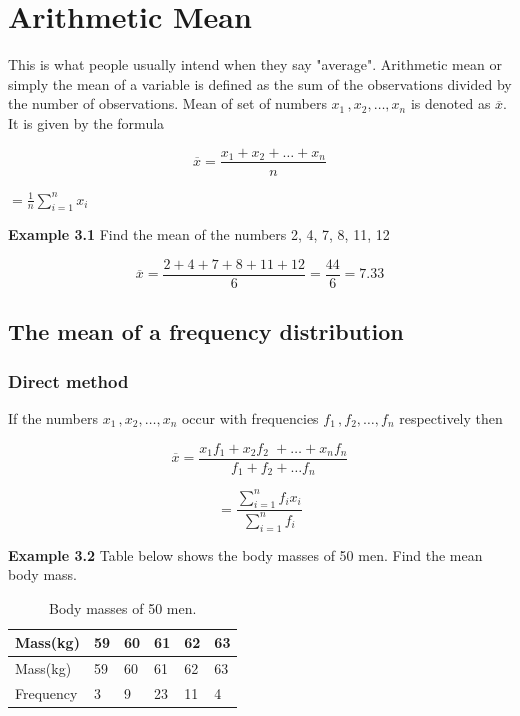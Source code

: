 \documentclass[
]{book}
\begin{document}
\hypertarget{arithmetic-mean}{%
\section{Arithmetic Mean}\label{arithmetic-mean}}

This is what people usually intend when they say "average". Arithmetic
mean or simply the mean of a variable is defined as the sum of the
observations divided by the number of observations. Mean of set of
numbers \(x_{1\ },x_{2},\ldots,x_{n}\) is denoted as \(\overline{x}\). It is
given by the formula

\[\overline{x} = \frac{x_{1} + x_{2} + \ldots + x_{n}}{n}\]

\(= \frac{1}{n}\sum_{i = 1}^{n}x_{i}\)

\textbf{Example 3.1} Find the mean of the numbers 2, 4, 7, 8, 11, 12

\[\overline{x} = \frac{2 + 4 + 7 + 8 + 11 + 12}{6} = \frac{44}{6} = 7.33\]

\hypertarget{the-mean-of-a-frequency-distribution}{%
\subsection{The mean of a frequency distribution}\label{the-mean-of-a-frequency-distribution}}

\hypertarget{direct-method}{%
\subsubsection{Direct method}\label{direct-method}}

If the numbers \(x_{1\ },x_{2},\ldots,x_{n}\) occur with frequencies
\(f_{1\ },f_{2},\ldots,f_{n}\) respectively then

\[\overline{x} = \frac{x_{1}f_{1} + x_{2}f_{2\ \ } + \ldots + x_{n}f_{n}}{f_{1} + f_{2} + \ldots f_{n}}\]

\[= \frac{\sum_{i = 1}^{n}{f_{i}x_{i}}}{\sum_{i = 1}^{n}f_{i}}\]

\textbf{Example 3.2} Table below shows the body masses of 50 men. Find the
mean body mass.

\begin{longtable}[]{@{}llllll@{}}
\caption{\label{tab:bodymass} Body masses of 50 men.}\tabularnewline
\toprule
Mass(kg) & 59 & 60 & 61 & 62 & 63 \\
\midrule
\endfirsthead
\toprule
Mass(kg) & 59 & 60 & 61 & 62 & 63 \\
\midrule
\endhead
Frequency & 3 & 9 & 23 & 11 & 4 \\
\bottomrule
\end{longtable}
\end{document}
